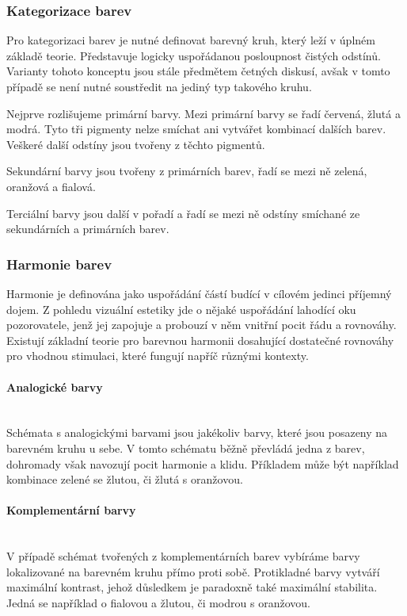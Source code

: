 \subsubsection{Kategorizace barev}
Pro kategorizaci barev je nutné definovat barevný kruh, který leží v úplném základě teorie. Představuje logicky uspořádanou posloupnost čistých odstínů. Varianty tohoto konceptu jsou stále předmětem četných diskusí, avšak v tomto případě
se není nutné soustředit na jediný typ takového kruhu.

Nejprve rozlišujeme primární barvy. Mezi primární barvy se řadí červená, žlutá a modrá. Tyto tři pigmenty nelze smíchat ani vytvářet kombinací dalších barev. Veškeré
další odstíny jsou tvořeny z těchto pigmentů.

Sekundární barvy jsou tvořeny z primárních barev, řadí se mezi ně zelená, oranžová a fialová.

Terciální barvy jsou další v pořadí a řadí se mezi ně odstíny smíchané ze sekundárních a primárních barev.

\subsubsection{Harmonie barev}
Harmonie je definována jako uspořádání částí budící v cílovém jedinci příjemný dojem. Z pohledu vizuální estetiky jde o nějaké uspořádání lahodící oku pozorovatele, 
jenž jej zapojuje a probouzí v něm vnitřní pocit řádu a rovnováhy. Existují základní teorie pro barevnou harmonii dosahující dostatečné rovnováhy pro
vhodnou stimulaci, které fungují napříč různými kontexty.

\paragraph{Analogické barvy}\mbox{}\\
Schémata s analogickými barvami jsou jakékoliv barvy, které jsou posazeny na barevném kruhu u sebe. V tomto schématu běžně převládá jedna z barev, dohromady však
navozují pocit harmonie a klidu. Příkladem může být například kombinace zelené se žlutou, či žlutá s oranžovou.

\paragraph{Komplementární barvy}\mbox{}\\
V případě schémat tvořených z komplementárních barev vybíráme barvy lokalizované na barevném kruhu přímo proti sobě. Protikladné barvy vytváří maximální kontrast,
jehož důsledkem je paradoxně také maximální stabilita. Jedná se například o fialovou a žlutou, či modrou s oranžovou.

